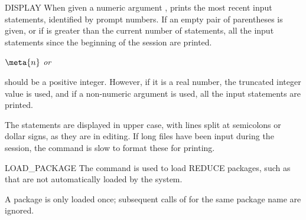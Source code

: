 \begin{Command}{DISPLAY}
When given a numeric argument ,  prints the 
most recent input statements, identified by prompt numbers.  If an empty
pair of parentheses is given, or if  is greater than the current
number of statements, all the input statements since the beginning of
the session are printed.

\begin{Syntax}
\(\meta{n}\) {\em or} \(\)
\end{Syntax}

 should be a positive integer.  However, if it is a real number, the
truncated integer value is used, and if a non-numeric argument is used, all
the input statements are printed.

\begin{Comments}
The statements are displayed in upper case, with lines split at semicolons or
dollar signs, as they are in editing.  If long files have been input during
the session, the  command is slow to format these for
printing.
\end{Comments}
\end{Command}


\begin{Command}{LOAD\_PACKAGE}
The  command is used to load REDUCE packages, such as
 that are not automatically loaded by the system.
\begin{Syntax}
\end{Syntax}

A package is only loaded once; subsequent calls of 
for the same package name are ignored.
\end{Command}


